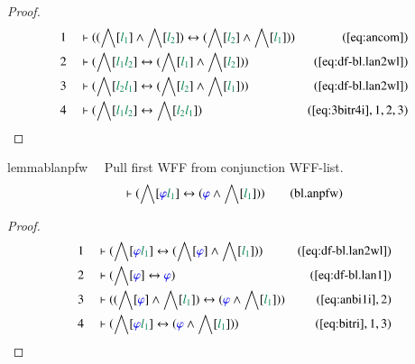 \begin{proof}
\begin{align}
  1 &&  & \vdash ( ( \bigwedge[ \mwl{l_1} ] \wedge \bigwedge[ \mwl{l_2} ] )
      \leftrightarrow ( \bigwedge[ \mwl{l_2} ] \wedge
      \bigwedge[ \mwl{l_1} ] )
      )&(\mbox{\ref{eq:ancom}})\notag
  \\ 2 &&  & \vdash ( \bigwedge[ \mwl{l_1} \mwl{l_2} ] \leftrightarrow (
      \bigwedge[ \mwl{l_1} ] \wedge \bigwedge[ \mwl{l_2} ]
      ) )&(\mbox{\ref{eq:df-bl.lan2wl}})\notag
  \\ 3 &&  & \vdash ( \bigwedge[ \mwl{l_2} \mwl{l_1} ] \leftrightarrow (
      \bigwedge[ \mwl{l_2} ] \wedge \bigwedge[ \mwl{l_1} ]
      ) )&(\mbox{\ref{eq:df-bl.lan2wl}})\notag
  \\ 4 &&  & \vdash ( \bigwedge[ \mwl{l_1} \mwl{l_2} ] \leftrightarrow
      \bigwedge[ \mwl{l_2} \mwl{l_1} ]
      )&(\mbox{\ref{eq:3bitr4i}},1,2,3)\notag
\end{align}
\end{proof}

\begin{restatable}{lemma}{blanpfw}~~ Pull first WFF from conjunction WFF-list.
\begin{align}
\vdash ( \bigwedge[ \mw{\varphi} \mwl{l_1} ] \leftrightarrow ( \mw{\varphi}
    \wedge \bigwedge[ \mwl{l_1} ] ) )\label{eq:bl.anpfw}\tag{bl.anpfw}
\end{align}
\end{restatable}

\begin{proof}
\begin{align}
  1 &&  & \vdash ( \bigwedge[ \mw{\varphi} \mwl{l_1} ] \leftrightarrow (
      \bigwedge[ \mw{\varphi} ] \wedge \bigwedge[ \mwl{l_1}
      ] ) )&(\mbox{\ref{eq:df-bl.lan2wl}})\notag
  \\ 2 &&  & \vdash ( \bigwedge[ \mw{\varphi} ] \leftrightarrow \mw{\varphi}
      )&(\mbox{\ref{eq:df-bl.lan1}})\notag
  \\ 3 &&  & \vdash ( ( \bigwedge[ \mw{\varphi} ] \wedge \bigwedge[ \mwl{l_1} ]
      ) \leftrightarrow ( \mw{\varphi} \wedge \bigwedge[
      \mwl{l_1} ] ) )&(\mbox{\ref{eq:anbi1i}},2)\notag
  \\ 4 &&  & \vdash ( \bigwedge[ \mw{\varphi} \mwl{l_1} ] \leftrightarrow (
      \mw{\varphi} \wedge \bigwedge[ \mwl{l_1} ] )
      )&(\mbox{\ref{eq:bitri}},1,3)\notag
\end{align}
\end{proof}

